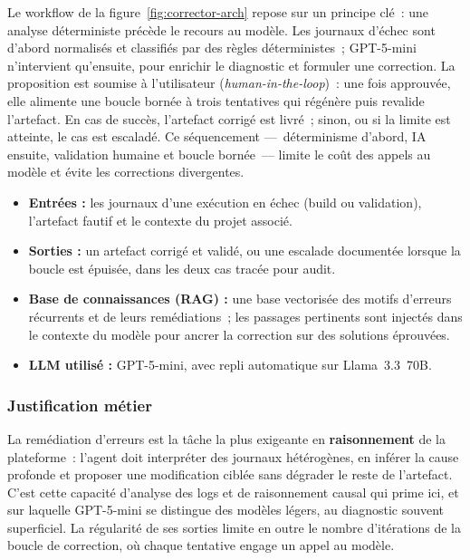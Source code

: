 Le workflow de la figure~\ref{fig:corrector-arch} repose sur un principe clé~: une analyse
déterministe précède le recours au modèle. Les journaux d'échec sont d'abord normalisés et
classifiés par des règles déterministes~; GPT-5-mini n'intervient qu'ensuite, pour enrichir
le diagnostic et formuler une correction. La proposition est soumise à l'utilisateur
(\textit{human-in-the-loop})~: une fois approuvée, elle alimente une boucle bornée à trois
tentatives qui régénère puis revalide l'artefact. En cas de succès, l'artefact corrigé est
livré~; sinon, ou si la limite est atteinte, le cas est escaladé. Ce séquencement
---~déterminisme d'abord, IA ensuite, validation humaine et boucle bornée~--- limite le
coût des appels au modèle et évite les corrections divergentes.

\begin{itemize}
    \item \textbf{Entrées :} les journaux d'une exécution en échec (build ou validation),
    l'artefact fautif et le contexte du projet associé.
    \item \textbf{Sorties :} un artefact corrigé et validé, ou une escalade documentée
    lorsque la boucle est épuisée, dans les deux cas tracée pour audit.
    \item \textbf{Base de connaissances (RAG) :} une base vectorisée des motifs d'erreurs
    récurrents et de leurs remédiations~; les passages pertinents sont injectés dans le
    contexte du modèle pour ancrer la correction sur des solutions éprouvées.
    \item \textbf{LLM utilisé :} GPT-5-mini, avec repli automatique sur Llama~3.3~70B.
\end{itemize}

\subsubsection{Justification métier}

La remédiation d'erreurs est la tâche la plus exigeante en \textbf{raisonnement} de la
plateforme~: l'agent doit interpréter des journaux hétérogènes, en inférer la cause profonde
et proposer une modification ciblée sans dégrader le reste de l'artefact. C'est cette
capacité d'analyse des logs et de raisonnement causal qui prime ici, et sur laquelle
GPT-5-mini se distingue des modèles légers, au diagnostic souvent superficiel. La régularité
de ses sorties limite en outre le nombre d'itérations de la boucle de correction, où chaque
tentative engage un appel au modèle.

